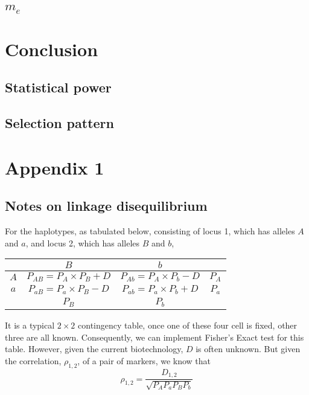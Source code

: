 \documentclass[]{book}
\begin{document}
\hypertarget{m_e}{%
\section{\texorpdfstring{\(m_e\)}{m\_e}}\label{m_e}}

\hypertarget{conclusion}{%
\chapter{Conclusion}\label{conclusion}}

\hypertarget{statistical-power}{%
\section{Statistical power}\label{statistical-power}}

\hypertarget{selection-pattern}{%
\section{Selection pattern}\label{selection-pattern}}

\hypertarget{app-1}{%
\chapter{Appendix 1}\label{app-1}}

\hypertarget{app:ld}{%
\section{Notes on linkage disequilibrium}\label{app:ld}}

For the haplotypes, as tabulated below, consisting of locus 1, which has
alleles \(A\) and \(a\), and locus 2, which has alleles \(B\) and \(b\),

\begin{longtable}[]{@{}cccc@{}}
\toprule
& \(B\) & \(b\) &\tabularnewline
\midrule
\endhead
\(A\) & \(P_{AB}=P_A \times P_B + D\) & \(P_{Ab}=P_A \times P_b - D\) &
\(P_A\)\tabularnewline
\(a\) & \(P_{aB}=P_a \times P_B - D\) & \(P_{ab}=P_a \times P_b + D\) &
\(P_a\)\tabularnewline
& \(P_B\) & \(P_b\) &\tabularnewline
\bottomrule
\end{longtable}

It is a typical \(2\times2\) contingency table, once one of these four
cell is fixed, other three are all known. Consequently, we can implement
Fisher's Exact test for this table. However, given the current
biotechnology, \(D\) is often unknown. But given the correlation,
\(\rho_{1,2}\), of a pair of markers, we know that
\[\rho_{1,2}=\frac{D_{1,2}}{\sqrt{P_AP_aP_BP_b}}\]
\end{document}
